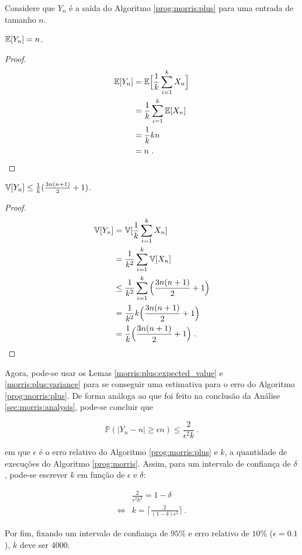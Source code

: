 Considere que $Y_n$ é a saída do Algoritmo \ref{prog:morris:plus} para uma entrada de tamanho $n$.

\begin{lemma}\label{morris:plus:expected_value}
  $\mathbb{E}[Y_n] = n$.
\end{lemma}

\begin{proof}

\begin{align*}
  \mathbb{E}[Y_n] 
    &= \mathbb{E} \Big[ \frac{1}{k} \sum_{i=1}^{k} X_n \Big]  \\
    &= \frac{1}{k} \sum_{i=1}^{k} \mathbb{E}[X_n] \\
    &= \frac{1}{k} k n  \\
    &= n \ .
\end{align*}

\end{proof}

\begin{lemma}\label{morris:plus:variance}
  $\mathbb{V}[Y_n] \leq \frac{1}{k} ( \frac{3n(n+1)}{2} + 1 )$.
\end{lemma}

\begin{proof}
  
\begin{align*}
  \mathbb{V}[Y_n] 
    &= \mathbb{V}[\frac{1}{k} \sum_{i=1}^{k} X_n] \\
    &= \frac{1}{k^2} \sum_{i=1}^{k}\mathbb{V}[X_n]  \\
    &\leq \frac{1}{k^2} \sum_{i=1}^{k} \Big( \frac{3n(n+1)}{2} + 1 \Big)  \\
    &= \frac{1}{k^2} k \Big( \frac{3n(n+1)}{2} + 1 \Big)  \\
    &= \frac{1}{k} \Big( \frac{3n(n+1)}{2} + 1 \Big) \ .
\end{align*}

\end{proof}

Agora, pode-se usar os Lemas \ref{morris:plus:expected_value} e \ref{morris:plus:variance} para se conseguir uma estimativa para o 
erro do Algoritmo \ref{prog:morris:plus}. De forma análoga ao que foi feito na conclusão da Análise \ref{sec:morris:analysis}, pode-se 
concluir que

\[ \mathbb{P}(|Y_n - n| \geq \epsilon n ) \leq \frac{2}{\epsilon^2 k} \ . \]

em que $\epsilon$ é o erro relativo do Algoritmo \ref{prog:morris:plus} e $k$, a quantidade de execuções do Algoritmo \ref{prog:morris}.
Assim, para um intervalo de confiança de $\delta$, pode-se escrever $k$ em função de $\epsilon$ e $\delta$:

\begin{align*}
      &\frac{2}{\epsilon^2 k^2} = 1 - \delta \\
  \iff& k = \Bigg\lceil \frac{2}{(1 - \delta) \epsilon^2} \Bigg\rceil \ .
\end{align*}

Por fim, fixando um intervalo de confiança de $95\%$ e erro relativo de $10\%$ ($\epsilon = 0.1$), $k$ deve ser $4000$.  
